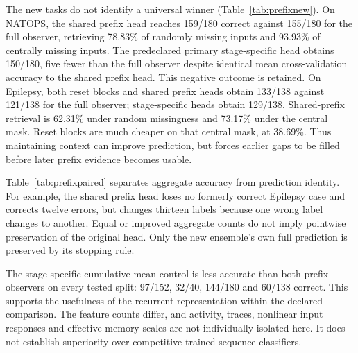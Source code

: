 \documentclass[11pt,a4paper]{article}
\theoremstyle{definition}\newtheorem{definition}[theorem]{Definition}
\begin{document}
\begin{table}[!htbp]\centering\small
\caption{First project evaluation on two additional public tasks under the same fixed protocol. Columns and guarantees are as in Table~\ref{tab:prefixdevelopment}. Results include the primary candidate's NATOPS accuracy loss.}
\label{tab:prefixnew}
\end{table}
The new tasks do not identify a universal winner (Table~\ref{tab:prefixnew}). On NATOPS, the shared prefix head reaches 159/180 correct against 155/180 for the full observer, retrieving 78.83\% of randomly missing inputs and 93.93\% of centrally missing inputs. The predeclared primary stage-specific head obtains 150/180, five fewer than the full observer despite identical mean cross-validation accuracy to the shared prefix head. This negative outcome is retained. On Epilepsy, both reset blocks and shared prefix heads obtain 133/138 against 121/138 for the full observer; stage-specific heads obtain 129/138. Shared-prefix retrieval is 62.31\% under random missingness and 73.17\% under the central mask. Reset blocks are much cheaper on that central mask, at 38.69\%. Thus maintaining context can improve prediction, but forces earlier gaps to be filled before later prefix evidence becomes usable.

\begin{table}[!htbp]\centering\small
\caption{Paired prediction changes relative to the full observer. Lost counts formerly correct cases made wrong; Gained counts formerly wrong cases made correct. Changed also includes changes between two incorrect labels. Net is the change in the number correct.}
\label{tab:prefixpaired}
\end{table}
Table~\ref{tab:prefixpaired} separates aggregate accuracy from prediction identity. For example, the shared prefix head loses no formerly correct Epilepsy case and corrects twelve errors, but changes thirteen labels because one wrong label changes to another. Equal or improved aggregate counts do not imply pointwise preservation of the original head. Only the new ensemble's own full prediction is preserved by its stopping rule.

The stage-specific cumulative-mean control is less accurate than both prefix observers on every tested split: 97/152, 32/40, 144/180 and 60/138 correct. This supports the usefulness of the recurrent representation within the declared comparison. The feature counts differ, and activity, traces, nonlinear input responses and effective memory scales are not individually isolated here. It does not establish superiority over competitive trained sequence classifiers.
\end{document}
